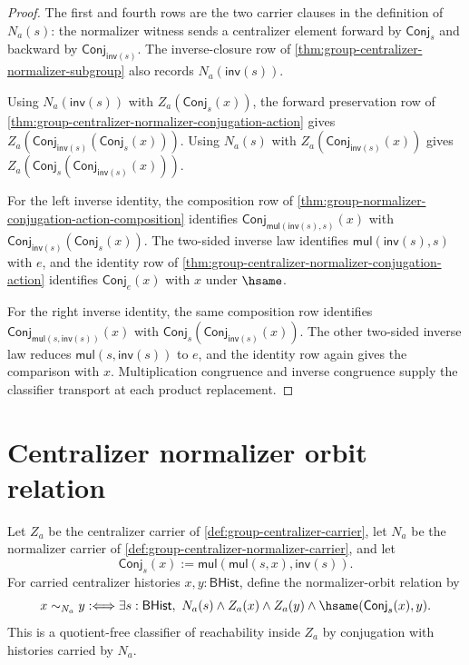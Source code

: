 \begin{proof}
The first and fourth rows are the two carrier clauses in the definition of
$N_a(s)$: the normalizer witness sends a centralizer element forward by
$\mathsf{Conj}_s$ and backward by $\mathsf{Conj}_{\mathsf{inv}(s)}$.
The inverse-closure row of
\autoref{thm:group-centralizer-normalizer-subgroup} also records
$N_a(\mathsf{inv}(s))$.

Using $N_a(\mathsf{inv}(s))$ with $Z_a(\mathsf{Conj}_s(x))$, the forward
preservation row of
\autoref{thm:group-centralizer-normalizer-conjugation-action} gives
$Z_a(\mathsf{Conj}_{\mathsf{inv}(s)}(\mathsf{Conj}_s(x)))$. Using $N_a(s)$
with $Z_a(\mathsf{Conj}_{\mathsf{inv}(s)}(x))$ gives
$Z_a(\mathsf{Conj}_s(\mathsf{Conj}_{\mathsf{inv}(s)}(x)))$.

For the left inverse identity, the composition row of
\autoref{thm:group-normalizer-conjugation-action-composition} identifies
$\mathsf{Conj}_{\mathsf{mul}(\mathsf{inv}(s),s)}(x)$ with
$\mathsf{Conj}_{\mathsf{inv}(s)}(\mathsf{Conj}_s(x))$. The two-sided inverse
law identifies $\mathsf{mul}(\mathsf{inv}(s),s)$ with $e$, and the identity
row of \autoref{thm:group-centralizer-normalizer-conjugation-action}
identifies $\mathsf{Conj}_e(x)$ with $x$ under $\hsame$.

For the right inverse identity, the same composition row identifies
$\mathsf{Conj}_{\mathsf{mul}(s,\mathsf{inv}(s))}(x)$ with
$\mathsf{Conj}_s(\mathsf{Conj}_{\mathsf{inv}(s)}(x))$. The other two-sided
inverse law reduces $\mathsf{mul}(s,\mathsf{inv}(s))$ to $e$, and the identity
row again gives the comparison with $x$. Multiplication congruence and
inverse congruence supply the classifier transport at each product
replacement.
\end{proof}

\section{Centralizer normalizer orbit relation}
\label{sec:group-centralizer-normalizer-orbit}

\begin{definition}
\label{def:group-centralizer-normalizer-orbit-relation}
Let $Z_a$ be the centralizer carrier of
\autoref{def:group-centralizer-carrier}, let $N_a$ be the normalizer carrier of
\autoref{def:group-centralizer-normalizer-carrier}, and let
$$
\mathsf{Conj}_s(x):=
\mathsf{mul}(\mathsf{mul}(s,x),\mathsf{inv}(s)).
$$
For carried centralizer histories $x,y:\mathsf{BHist}$, define the
normalizer-orbit relation by
$$
x\sim_{N_a}y
:\Longleftrightarrow
\exists s:\mathsf{BHist},\
N_a(s)\land Z_a(x)\land Z_a(y)\land
\hsame(\mathsf{Conj}_s(x),y).
$$
This is a quotient-free classifier of reachability inside $Z_a$ by conjugation
with histories carried by $N_a$.
\end{definition}

